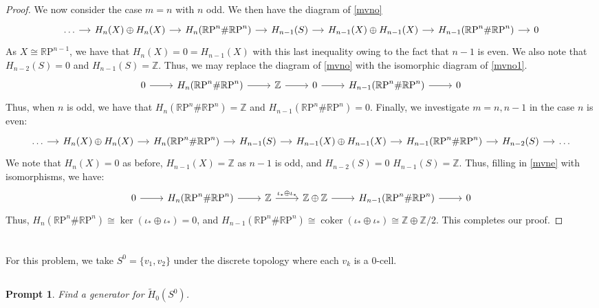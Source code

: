 \documentclass[english]{article}
\newcommand{\RR}{\mathbb{R}}
\newcommand{\ZZ}{\mathbb{Z}}
\newcommand{\prob}[1]{\setcounter{section}{#1-1}\section{}}
\newcommand{\prt}[1]{\setcounter{subsection}{#1-1}\subsection{}}
\newtheorem*{prompt*}{Prompt}
\theoremstyle{remark}
\theoremstyle{definition}
\newcommand{\tH}{\tilde{H}}
\newcommand{\RP}{{\RR\mathrm{P}}}
\newcommand{\csm}{\RP^n\#\RP^n}
\DeclareMathOperator{\coker}{coker}
\begin{document}
\begin{proof}
We now consider the case $m=n$ with $n$ odd. We then have the diagram of \eqref{mvno}
\begin{equation}
	\label{mvno}\begin{tikzcd}[column sep=small]
	\ldots \arrow[r]& H_n(X)\oplus H_n(X)\arrow[r]& H_n(\csm)\arrow[r] &H_{n-1} (S)\arrow[r]&H_{n-1}(X)\oplus H_{n-1}(X)\arrow[r]& H_{n-1}(\csm)\arrow[r]& 0
	\end{tikzcd}
\end{equation}
As $X\cong \RP^{n-1}$, we have that $H_n(X)=0=H_{n-1}(X)$ with this last inequality owing to the fact that $n-1$ is even. We also note that $H_{n-2}(S)=0$ and $H_{n-1}(S)=\ZZ$. Thus, we may replace the diagram of \eqref{mvno} with the isomorphic diagram of \eqref{mvno1}.
\begin{equation}
\label{mvno1}\begin{tikzcd}[column sep=normal]
0\arrow[r]& H_n(\csm)\arrow[r] &\ZZ\arrow[r]&0\arrow[r]& H_{n-1}(\csm)\arrow[r]& 0
\end{tikzcd}
\end{equation}
Thus, when $n$ is odd, we have that $H_n(\csm)=\ZZ$ and $H_{n-1}(\csm)=0$. Finally, we investigate $m=n,n-1$ in the case $n$ is even:
\begin{equation}
\begin{tikzcd}[column sep=small]
\ldots \arrow[r]& H_n(X)\oplus H_n(X)\arrow[r]& H_n(\csm)\arrow[r] &H_{n-1} (S)\arrow[r]&H_{n-1}(X)\oplus H_{n-1}(X)\arrow[r]& H_{n-1}(\csm)\arrow[r]& H_{n-2}(S)\arrow[r]&\ldots
\end{tikzcd}\label{mvne}
\end{equation}
We note that $H_n(X)=0$ as before, $H_{n-1}(X)=\ZZ$ as $n-1$ is odd, and $H_{n-2}(S)=0$ $H_{n-1}(S)=\ZZ$. Thus, filling in \eqref{mvne} with isomorphisms, we have:
\begin{equation}
\begin{tikzcd}[column sep=normal]
0\arrow[r]& H_n(\csm)\arrow[r] &\ZZ \arrow[r,"\iota_*\oplus\iota_*"]&\ZZ\oplus \ZZ\arrow[r]& H_{n-1}(\csm)\arrow[r]&0
\end{tikzcd}\label{mvnei}
\end{equation}
Thus, $H_n(\csm)\cong \ker(\iota_*\oplus \iota_*)=0$, and $H_{n-1}(\csm)\cong \coker(\iota_*\oplus \iota_*)\cong \ZZ\oplus \ZZ/2$. This completes our proof.
\end{proof}
\prob{2} For this problem, we take $S^0=\{v_1,v_2\}$ under the discrete topology where each $v_k$ is a $0$-cell.
\prt{1}\begin{prompt*}
	Find a generator for $\tH_0(S^0)$. 
\end{prompt*}
\end{document}
